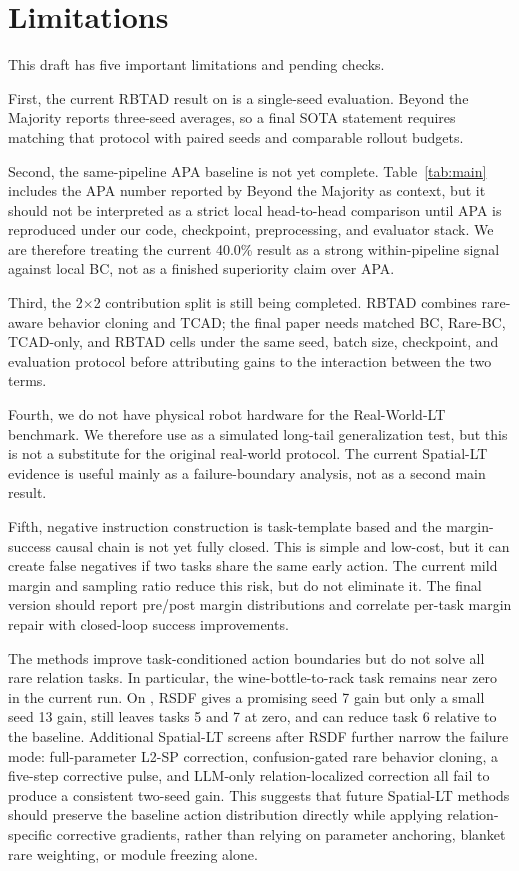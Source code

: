 \section{Limitations}

This draft has five important limitations and pending checks.

First, the current RBTAD result on \liberocorelt{} is a single-seed evaluation. Beyond the Majority reports three-seed averages, so a final SOTA statement requires matching that protocol with paired seeds and comparable rollout budgets.

Second, the same-pipeline APA baseline is not yet complete. Table~\ref{tab:main} includes the APA number reported by Beyond the Majority as context, but it should not be interpreted as a strict local head-to-head comparison until APA is reproduced under our code, checkpoint, preprocessing, and evaluator stack. We are therefore treating the current 40.0\% result as a strong within-pipeline signal against local BC, not as a finished superiority claim over APA.

Third, the 2$\times$2 contribution split is still being completed. RBTAD combines rare-aware behavior cloning and TCAD; the final paper needs matched BC, Rare-BC, TCAD-only, and RBTAD cells under the same seed, batch size, checkpoint, and evaluation protocol before attributing gains to the interaction between the two terms.

Fourth, we do not have physical robot hardware for the Real-World-LT benchmark. We therefore use \liberospatiallt{} as a simulated long-tail generalization test, but this is not a substitute for the original real-world protocol. The current Spatial-LT evidence is useful mainly as a failure-boundary analysis, not as a second main result.

Fifth, negative instruction construction is task-template based and the margin-success causal chain is not yet fully closed. This is simple and low-cost, but it can create false negatives if two tasks share the same early action. The current mild margin and sampling ratio reduce this risk, but do not eliminate it. The final version should report pre/post margin distributions and correlate per-task margin repair with closed-loop success improvements.

The methods improve task-conditioned action boundaries but do not solve all rare relation tasks. In particular, the wine-bottle-to-rack task remains near zero in the current \liberocorelt{} run. On \liberospatiallt{}, RSDF gives a promising seed 7 gain but only a small seed 13 gain, still leaves tasks 5 and 7 at zero, and can reduce task 6 relative to the baseline. Additional Spatial-LT screens after RSDF further narrow the failure mode: full-parameter L2-SP correction, confusion-gated rare behavior cloning, a five-step corrective pulse, and LLM-only relation-localized correction all fail to produce a consistent two-seed gain. This suggests that future Spatial-LT methods should preserve the baseline action distribution directly while applying relation-specific corrective gradients, rather than relying on parameter anchoring, blanket rare weighting, or module freezing alone.